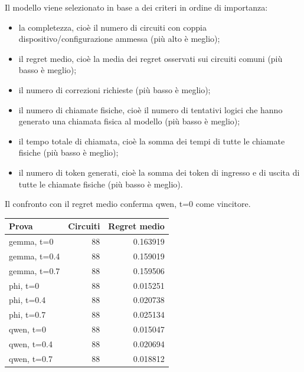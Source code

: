 Il modello viene selezionato in base a dei criteri in ordine di importanza:
\begin{itemize}
  \item la completezza, cioè il numero di circuiti con coppia dispositivo/configurazione ammessa (più alto è meglio);
  \item il regret medio, cioè la media dei regret osservati sui circuiti comuni (più basso è meglio);
  \item il numero di correzioni richieste (più basso è meglio);
  \item il numero di chiamate fisiche, cioè il numero di tentativi logici che hanno generato una chiamata fisica al modello (più basso è meglio);
  \item il tempo totale di chiamata, cioè la somma dei tempi di tutte le chiamate fisiche (più basso è meglio);
  \item il numero di token generati, cioè la somma dei token di ingresso e di uscita di tutte le chiamate fisiche (più basso è meglio).
\end{itemize}


Il confronto con il regret medio conferma qwen, t=0 come vincitore.

\begin{center}\small\begin{tabular}{lrr}\toprule Prova & Circuiti & Regret medio\\\midrule

gemma, t=0 & 88 & 0.163919\\

gemma, t=0.4 & 88 & 0.159019\\

gemma, t=0.7 & 88 & 0.159506\\

phi, t=0 & 88 & 0.015251\\

phi, t=0.4 & 88 & 0.020738\\

phi, t=0.7 & 88 & 0.025134\\

qwen, t=0 & 88 & 0.015047\\

qwen, t=0.4 & 88 & 0.020694\\

qwen, t=0.7 & 88 & 0.018812\\

\bottomrule\end{tabular}\end{center}



